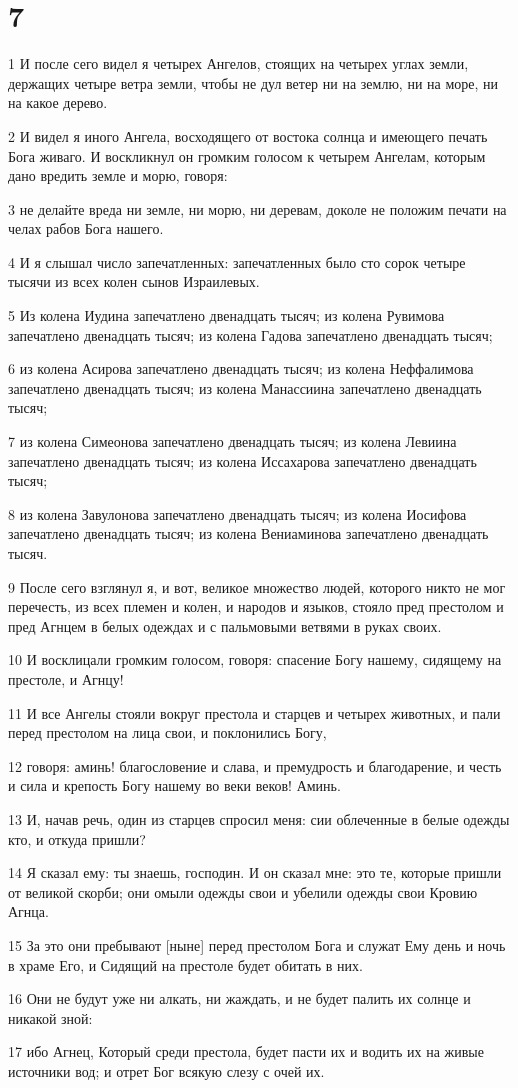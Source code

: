 \chapter{7}

\par 1 И после сего видел я четырех Ангелов, стоящих на четырех углах земли, держащих четыре ветра земли, чтобы не дул ветер ни на землю, ни на море, ни на какое дерево.
\par 2 И видел я иного Ангела, восходящего от востока солнца и имеющего печать Бога живаго. И воскликнул он громким голосом к четырем Ангелам, которым дано вредить земле и морю, говоря:
\par 3 не делайте вреда ни земле, ни морю, ни деревам, доколе не положим печати на челах рабов Бога нашего.
\par 4 И я слышал число запечатленных: запечатленных было сто сорок четыре тысячи из всех колен сынов Израилевых.
\par 5 Из колена Иудина запечатлено двенадцать тысяч; из колена Рувимова запечатлено двенадцать тысяч; из колена Гадова запечатлено двенадцать тысяч;
\par 6 из колена Асирова запечатлено двенадцать тысяч; из колена Неффалимова запечатлено двенадцать тысяч; из колена Манассиина запечатлено двенадцать тысяч;
\par 7 из колена Симеонова запечатлено двенадцать тысяч; из колена Левиина запечатлено двенадцать тысяч; из колена Иссахарова запечатлено двенадцать тысяч;
\par 8 из колена Завулонова запечатлено двенадцать тысяч; из колена Иосифова запечатлено двенадцать тысяч; из колена Вениаминова запечатлено двенадцать тысяч.
\par 9 После сего взглянул я, и вот, великое множество людей, которого никто не мог перечесть, из всех племен и колен, и народов и языков, стояло пред престолом и пред Агнцем в белых одеждах и с пальмовыми ветвями в руках своих.
\par 10 И восклицали громким голосом, говоря: спасение Богу нашему, сидящему на престоле, и Агнцу!
\par 11 И все Ангелы стояли вокруг престола и старцев и четырех животных, и пали перед престолом на лица свои, и поклонились Богу,
\par 12 говоря: аминь! благословение и слава, и премудрость и благодарение, и честь и сила и крепость Богу нашему во веки веков! Аминь.
\par 13 И, начав речь, один из старцев спросил меня: сии облеченные в белые одежды кто, и откуда пришли?
\par 14 Я сказал ему: ты знаешь, господин. И он сказал мне: это те, которые пришли от великой скорби; они омыли одежды свои и убелили одежды свои Кровию Агнца.
\par 15 За это они пребывают [ныне] перед престолом Бога и служат Ему день и ночь в храме Его, и Сидящий на престоле будет обитать в них.
\par 16 Они не будут уже ни алкать, ни жаждать, и не будет палить их солнце и никакой зной:
\par 17 ибо Агнец, Который среди престола, будет пасти их и водить их на живые источники вод; и отрет Бог всякую слезу с очей их.

